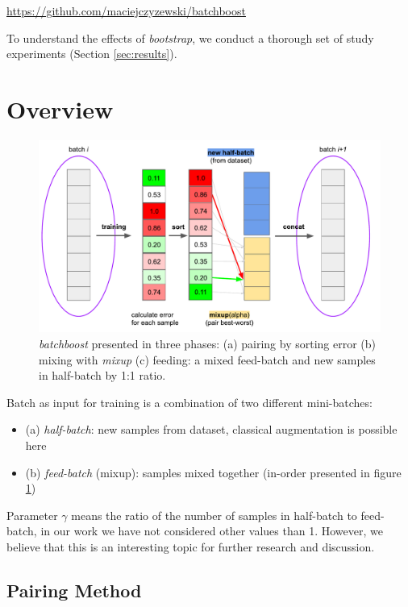 \documentclass{article}
\begin{document}
\begin{center}
\url{https://github.com/maciejczyzewski/batchboost}
\end{center}

To understand the effects of \emph{bootstrap}, we conduct a
thorough set of study experiments (Section \ref{sec:results}).

\section{Overview}
\label{sec:overview}

\begin{figure}[H]
  \centering
  \includegraphics[width=\linewidth]{figure-abstract}
  \caption{\emph{batchboost} presented in three phases: (a) pairing by sorting
	  error (b) mixing with \emph{mixup} (c) feeding: a mixed feed-batch and new
	  samples in half-batch by 1:1 ratio.}
  \label{fig:abstract}
\end{figure}

Batch as input for training is a combination of two different mini-batches:
\begin{itemize}
\item (a) \emph{half-batch}: new samples from dataset, classical augmentation is possible here
\item (b) \emph{feed-batch} (mixup): samples mixed together (in-order presented in
figure \ref{fig:abstract})
\end{itemize}

Parameter $\gamma$ means the ratio of the number of samples in half-batch to
feed-batch, in our work we have not considered other values than 1. However, we believe that this is an interesting topic for further research and discussion.

\subsection{Pairing Method}
\label{sec:pairing}
\end{document}

